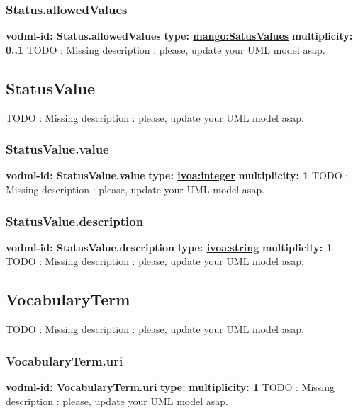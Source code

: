     \subsubsection{Status.allowedValues}
      \textbf{vodml-id: Status.allowedValues} \newline
      \textbf{type: \hyperref[sect:SatusValues]{mango:SatusValues}} \newline
      \textbf{multiplicity: 0..1} \newline
      TODO : Missing description : please, update your UML model asap.

  \subsection{StatusValue}
  \label{sect:StatusValue}
    TODO : Missing description : please, update your UML model asap.

    \subsubsection{StatusValue.value}
      \textbf{vodml-id: StatusValue.value} \newline
      \textbf{type: \hyperref[sect:ivoa]{ivoa:integer}} \newline
      \textbf{multiplicity: 1} \newline
      TODO : Missing description : please, update your UML model asap.

    \subsubsection{StatusValue.description}
      \textbf{vodml-id: StatusValue.description} \newline
      \textbf{type: \hyperref[sect:ivoa]{ivoa:string}} \newline
      \textbf{multiplicity: 1} \newline
      TODO : Missing description : please, update your UML model asap.

  \subsection{VocabularyTerm}
  \label{sect:VocabularyTerm}
    TODO : Missing description : please, update your UML model asap.

    \subsubsection{VocabularyTerm.uri}
      \textbf{vodml-id: VocabularyTerm.uri} \newline
      \textbf{type: } \newline
      \textbf{multiplicity: 1} \newline
      TODO : Missing description : please, update your UML model asap.

